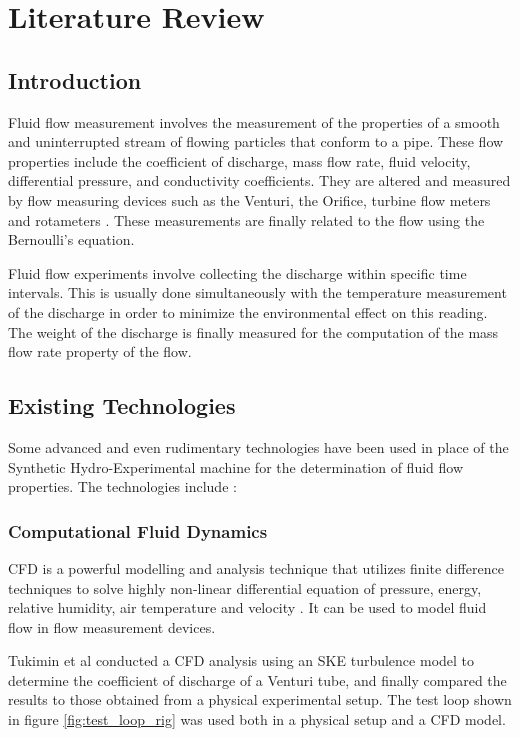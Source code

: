 \section{Literature Review}
\label{sec:review}
\subsection{Introduction}
Fluid flow measurement involves the measurement of the properties of a smooth and uninterrupted stream of flowing particles that conform to a pipe. These flow properties include the coefficient of discharge, mass flow rate, fluid velocity, differential pressure, and conductivity coefficients. They are altered and measured by flow measuring devices such as the Venturi, the Orifice, turbine flow meters and rotameters \cite{nandagopal2022fluid}. These measurements are finally related to the flow using the Bernoulli's equation. 
\par
Fluid flow experiments involve collecting the discharge within specific time intervals. This is usually done simultaneously with the temperature measurement of the discharge in order to minimize the environmental effect on this reading. The weight of the discharge is finally measured for the computation of the mass flow rate property of the flow.

\subsection{Existing Technologies}
Some advanced and even rudimentary technologies have been used in place of the Synthetic Hydro-Experimental machine for the determination of fluid flow properties. The technologies include :   
\subsubsection{Computational Fluid Dynamics}
\ac{CFD} is a powerful modelling and analysis technique that utilizes finite difference techniques to solve highly non-linear differential equation of pressure, energy, relative humidity, air temperature and velocity \cite{kuntz2009pre}. It can be used to model fluid flow in flow measurement devices.
\par
Tukimin et al \cite{tukimin2016cfd} conducted a CFD analysis using an \ac{SKE} turbulence model to determine the coefficient of discharge of a Venturi tube, and finally compared the results to those obtained from a physical experimental setup. The test loop shown in figure \ref{fig:test_loop_rig} was used both in a physical setup and a CFD model. 

